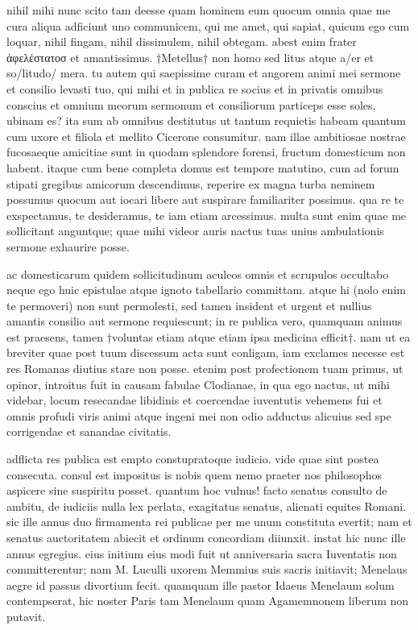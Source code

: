 


 nihil mihi nunc scito tam deesse quam hominem eum quocum omnia quae me cura aliqua adficiunt uno communicem, qui me amet, qui sapiat, quicum ego cum loquar, nihil fingam, nihil dissimulem, nihil obtegam. abest enim frater ἀφελέστατοσ et amantissimus. †Metellus† non homo sed litus atque a/er et so/litudo/ mera. tu autem qui saepissime curam et angorem animi mei sermone et consilio levasti tuo, qui mihi et in publica re socius et in privatis omnibus conscius et omnium meorum sermonum et consiliorum particeps esse soles, ubinam es? ita sum ab omnibus destitutus ut tantum requietis habeam quantum cum uxore et filiola et mellito Cicerone consumitur. nam illae ambitiosae nostrae fucosaeque amicitiae sunt in quodam splendore forensi, fructum domesticum non habent. itaque cum bene completa domus est tempore matutino, cum ad forum stipati gregibus amicorum descendimus, reperire ex magna turba neminem possumus quocum aut iocari libere aut suspirare familiariter possimus. qua re te exspectamus, te desideramus, te iam etiam arcessimus. multa sunt enim quae me sollicitant anguntque; quae mihi videor auris nactus tuas unius ambulationis sermone exhaurire posse.

 ac domesticarum quidem sollicitudinum aculeos omnis et scrupulos occultabo neque ego huic epistulae atque ignoto tabellario committam. atque hi (nolo enim te permoveri) non sunt permolesti, sed tamen insident et urgent et nullius amantis consilio aut sermone requiescunt; in re publica vero, quamquam animus est praesens, tamen †voluntas etiam atque etiam ipsa medicina efficit†. nam ut ea breviter quae post tuum discessum acta sunt conligam, iam exclames necesse est res Romanas diutius stare non posse. etenim post profectionem tuam primus, ut opinor, introitus fuit in causam fabulae Clodianae, in qua ego nactus, ut mihi videbar, locum resecandae libidinis et coercendae iuventutis vehemens fui et omnis profudi viris animi atque ingeni mei non odio adductus alicuius sed spe corrigendae et sanandae civitatis.

 adflicta res publica est empto constupratoque iudicio. vide quae sint postea consecuta. consul est impositus is nobis quem nemo praeter nos philosophos aspicere sine suspiritu posset. quantum hoc vulnus! facto senatus consulto de ambitu, de iudiciis nulla lex perlata, exagitatus senatus, alienati equites Romani. sic ille annus duo firmamenta rei publicae per me unum constituta evertit; nam et senatus auctoritatem abiecit et ordinum concordiam diiunxit. instat hic nunc ille annus egregius. eius initium eius modi fuit ut anniversaria sacra Iuventatis non committerentur; nam M. Luculli uxorem Memmius suis sacris initiavit; Menelaus aegre id passus divortium fecit. quamquam ille pastor Idaeus Menelaum solum contempserat, hic noster Paris tam Menelaum quam Agamemnonem liberum non putavit.

